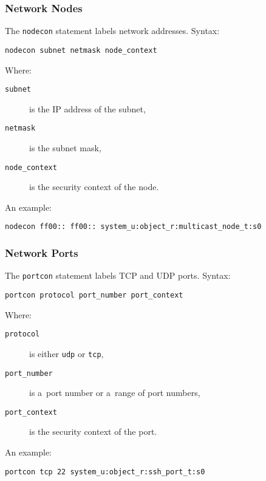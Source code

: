 \subsubsection{Network Nodes}
The \texttt{nodecon} statement labels network addresses. Syntax:
\begin{lstlisting}[language=te]
nodecon subnet netmask node_context
\end{lstlisting}
Where:
\begin{description}
    \item [\texttt{subnet}] is the IP address of the subnet,
    \item [\texttt{netmask}] is the subnet mask,
    \item [\texttt{node\_context}] is the security context of the node.
\end{description}
An example:
\begin{lstlisting}[language=te]
nodecon ff00:: ff00:: system_u:object_r:multicast_node_t:s0
\end{lstlisting}

\subsubsection{Network Ports}
The \texttt{portcon} statement labels TCP and UDP ports. Syntax:
\begin{lstlisting}[language=te]
portcon protocol port_number port_context
\end{lstlisting}
Where:
\begin{description}
    \item [\texttt{protocol}] is either \texttt{udp} or \texttt{tcp},
    \item [\texttt{port\_number}] is a~port number or a~range of port numbers,
    \item [\texttt{port\_context}] is the security context of the port.
\end{description}
An example:
\begin{lstlisting}[language=te]
portcon tcp 22 system_u:object_r:ssh_port_t:s0
\end{lstlisting}


